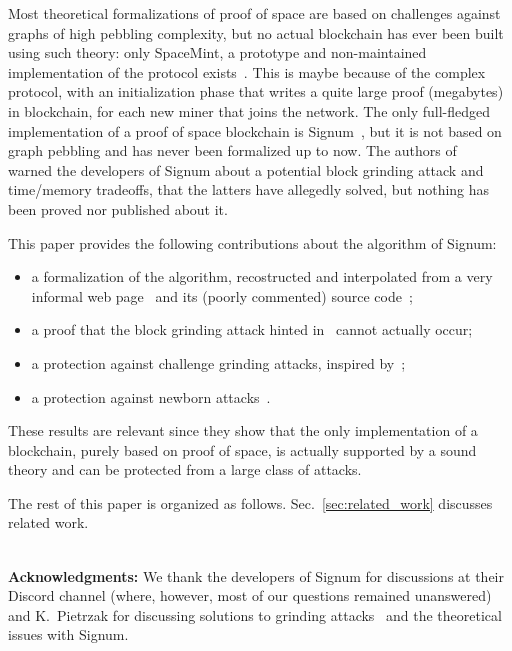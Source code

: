 Most theoretical formalizations of proof of space are
based on challenges against graphs of high pebbling complexity, but
no actual blockchain has ever been built using such theory: only SpaceMint, a prototype and non-maintained
implementation of the protocol exists~\cite{ParkKFGAP18}. This is maybe because of the
complex protocol, with an initialization phase
that writes a quite large proof (megabytes) in blockchain,
for each new miner that joins the network.
The only full-fledged implementation of a proof of space blockchain is Signum~\cite{Signum}, but it is not
based on graph pebbling and has never been formalized up to now.
The authors of~\cite{ParkKFGAP18} warned the developers of Signum about a potential block grinding attack and
time/memory tradeoffs, that the latters have allegedly solved,
but nothing has been proved nor published about it.

This paper provides the following contributions about the algorithm of Signum:
%
\begin{itemize}
\item a formalization of the algorithm, recostructed and interpolated from a very informal
  web page~\cite{SignumPlotting} and its (poorly commented) source code~\cite{SignumSource};
\item a proof that the block grinding attack hinted in~\cite{ParkKFGAP18} cannot actually occur;
\item a protection against challenge grinding attacks, inspired by~\cite{ParkKFGAP18};
\item a protection against newborn attacks~\cite{TangZDWLG0L19}.
\end{itemize}
%
These results are relevant since they show that the only implementation
of a blockchain, purely based on proof of space, is actually supported by a sound theory
and can be protected from a large class of attacks.

The rest of this paper is organized as follows.
Sec.~\ref{sec:related_work} discusses related work.

\mbox{}\\

\textbf{Acknowledgments:}
We thank the developers of Signum for discussions at their Discord channel (where, however, most
of our questions remained unanswered) and K.\ Pietrzak for discussing solutions to
grinding attacks~\cite{ParkKFGAP18} and the theoretical issues with Signum.
